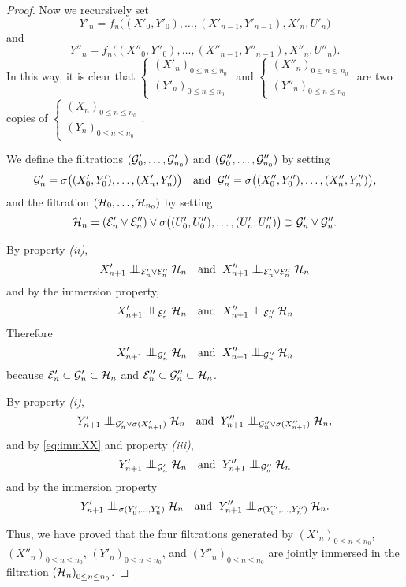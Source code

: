 \documentclass[12pt,a4paper]{article}
\begin{document}
\begin{proof}
Now we recursively set 
$$
Y'_n = f_n\bigl((X'_0,Y'_0), \ldots, (X'_{n-1}, Y'_{n-1}), X'_n, U'_n\bigr)
$$
and 
$$
Y''_n = f_n\bigl((X''_0,Y''_0), \ldots, (X''_{n-1}, Y''_{n-1}), X''_n, U''_n\bigr).
$$
In this way, it is clear that $\left\{\begin{smallmatrix} {(X'_n)}_{0 \leq n \leq n_0} \\ 
{(Y'_n)}_{0 \leq n \leq n_0}
\end{smallmatrix}\right.$ and 
$\left\{\begin{smallmatrix} {(X''_n)}_{0 \leq n \leq n_0} \\ 
{(Y''_n)}_{0 \leq n \leq n_0}
\end{smallmatrix}\right.$
are two copies of 
$\left\{\begin{smallmatrix} {(X_n)}_{0 \leq n \leq n_0} \\ 
{(Y_n)}_{0 \leq n \leq n_0}
\end{smallmatrix}\right.$.

We define the filtrations  $(\mathcal{G}'_0, \ldots, \mathcal{G}'_{n_0})$ 
and  $(\mathcal{G}''_0, \ldots, \mathcal{G}''_{n_0})$ by setting 
$$
\mathcal{G}'_n = \sigma\bigl((X'_0,Y'_0), \ldots, (X'_n, Y'_n)\bigr) 
\quad \text{and }\;
\mathcal{G}''_n = \sigma\bigl((X''_0,Y''_0), \ldots, (X''_n, Y''_n)\bigr), 
$$
and  the filtration $(\mathcal{H}_0, \ldots, \mathcal{H}_{n_0})$ by setting 
$$
\mathcal{H}_n = (\mathcal{E}'_n \vee \mathcal{E}''_n) \vee \sigma\bigl((U'_0,U''_0), \ldots, (U'_n, U''_n) \bigr) 
\supset  \mathcal{G}'_n \vee \mathcal{G}''_n.
$$

By property {\it(ii)}, 
$$
X'_{n+1} \indep_{\EEE'_n\vee\EEE''_n} \HH_n 
\quad \text{and }\;
X''_{n+1} \indep_{\EEE'_n\vee\EEE''_n} \HH_n 
$$
and by the immersion property, 
\begin{equation}\label{eq:immX}
X'_{n+1} \indep_{\EEE'_n} \HH_n 
\quad \text{and }\;
X''_{n+1} \indep_{\EEE''_n} \HH_n 
\end{equation}
Therefore
\begin{equation}\label{eq:immXX}
X'_{n+1} \indep_{\GG'_n} \HH_n 
\quad \text{and }\;
X''_{n+1} \indep_{\GG''_n} \HH_n 
\end{equation}
because $\mathcal{E}'_n \subset \mathcal{G}'_n \subset \mathcal{H}_n$ and 
$\mathcal{E}''_n \subset \mathcal{G}''_n \subset \mathcal{H}_n$.

By property {\it(i)}, 
$$
Y'_{n+1} \indep_{\GG'_n \vee \sigma(X'_{n+1})} \HH_n 
\quad \text{and }\;
Y''_{n+1} \indep_{\GG''_n \vee \sigma(X''_{n+1})} \HH_n, 
$$
and by \eqref{eq:immXX} and property {\it(iii)},
$$
Y'_{n+1} \indep_{\GG'_n} \HH_n 
\quad \text{and }\;
Y''_{n+1} \indep_{\GG''_n} \HH_n
$$
and  by the immersion property 
$$
Y'_{n+1} \indep_{\sigma(Y'_0, \ldots, Y'_n)} \HH_n 
\quad \text{and }\;
Y''_{n+1} \indep_{\sigma(Y''_0, \ldots, Y''_n)} \HH_n.
$$

Thus, we have proved that the four filtrations generated by 
${(X'_n)}_{0 \leq n \leq n_0}$, ${(X''_n)}_{0 \leq n \leq n_0}$, 
${(Y'_n)}_{0 \leq n \leq n_0}$, and ${(Y''_n)}_{0 \leq n \leq n_0}$ 
are jointly immersed in the filtration ${(\mathcal{H}_n)}_{0 \leq n \leq n_0}$.
\end{proof}
\end{document}
